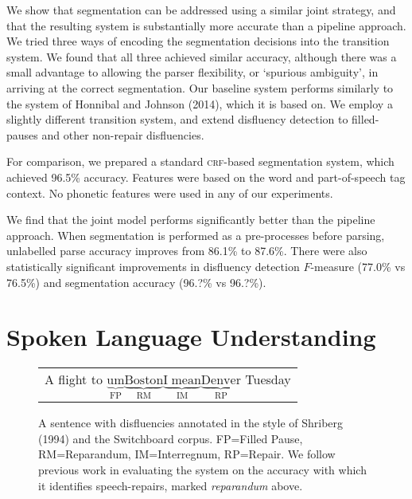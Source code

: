 \documentclass[11pt,letterpaper]{article}
\begin{document}
We show that segmentation can be addressed using a similar joint strategy, and that
the resulting system is substantially more accurate than a pipeline approach.
We tried three ways of encoding the segmentation decisions into the transition
system.  We found that all three achieved similar accuracy, although there was
a small advantage to allowing the parser flexibility, or `spurious ambiguity',
in arriving at the correct segmentation.
Our baseline system performs similarly to the system of Honnibal and Johnson (2014),
which it is based on.  We employ a slightly different transition system, and
extend disfluency detection to filled-pauses and other non-repair disfluencies.

For comparison, we prepared a standard \textsc{crf}-based segmentation system,
which achieved 96.5\% accuracy.  Features were based on the word and part-of-speech
tag context.  No phonetic features were used in any of our experiments.

We find that the joint model performs significantly better than the pipeline approach.
When segmentation is performed as a pre-processes before parsing, unlabelled parse
accuracy improves from 86.1\% to 87.6\%.  There were also statistically significant
improvements in disfluency detection $F$-measure (77.0\% vs 76.5\%) and segmentation
accuracy (96.?\% vs 96.?\%).

\section{Spoken Language Understanding}

\begin{figure}
    \begin{tabular}{l}

        A flight to $\underbrace{\mathrm{um}}_\text{FP} \underbrace{\mathrm{Boston}}_\text{RM} \underbrace{\mathrm{I\;mean}}_\text{IM} \underbrace{\mathrm{Denver}}_\text{RP}$ Tuesday\\

\end{tabular}
\caption{\small A sentence with disfluencies annotated in the style of Shriberg (1994) 
    and the Switchboard corpus.
FP=Filled Pause, RM=Reparandum, IM=Interregnum, RP=Repair.
We follow previous work in evaluating the system on the accuracy with which
it identifies speech-repairs, marked \emph{reparandum} above.
\label{fig:shriberg}}
\vspace*{-1.5em}
\end{figure}
\end{document}

